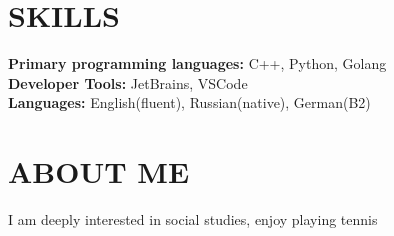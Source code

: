 \documentclass[letterpaper,11pt]{article}
\makeatletter
\newcommand{\resumeItem}[1]{
  \item\small{
    {#1 \vspace{-2pt}}
  }
}
\newcommand{\resumeSubheading}[4]{
  \vspace{-2pt}\item
    \begin{tabular*}{1.0\textwidth}[t]{l@{\extracolsep{\fill}}r}
      \textbf{\large#1} & \textbf{\small #2} \\
      \textit{\large#3} & \textit{\small #4} \\
      
    \end{tabular*}\vspace{-7pt}
}
\newcommand{\resumeSubHeadingListStart}{\begin{itemize}[leftmargin=0.0in, label={}]}
\newcommand{\resumeSubHeadingListEnd}{\end{itemize}}
\newcommand{\resumeItemListStart}{\begin{itemize}}
\newcommand{\resumeItemListEnd}{\end{itemize}\vspace{-5pt}}
\newcommand\sbullet[1][.5]{\mathbin{\vcenter{\hbox{\scalebox{#1}{$\bullet$}}}}}
\makeatother
\begin{document}
\section{SKILLS}
 \begin{itemize}[leftmargin=0.15in, label={}]
    \small{\item{
     \textbf{\normalsize{Primary programming languages:}}{ \normalsize{C++, Python, Golang}} \\
     \textbf{\normalsize{Developer Tools:}}{ \normalsize{JetBrains, VSCode}} \\
     \textbf{\normalsize{Languages:}}{\normalsize{ English(fluent), Russian(native), German(B2) }} \\
    }}
 \end{itemize}
 \vspace{-15pt}


\section{ABOUT ME}
    I am deeply interested in social studies, enjoy playing tennis
 

\end{document}
